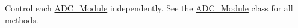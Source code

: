 Control each \mbox{\hyperlink{class_a_d_c___module}{A\+D\+C\+\_\+\+Module}} independently. See the \mbox{\hyperlink{class_a_d_c___module}{A\+D\+C\+\_\+\+Module}} class for all methods. 